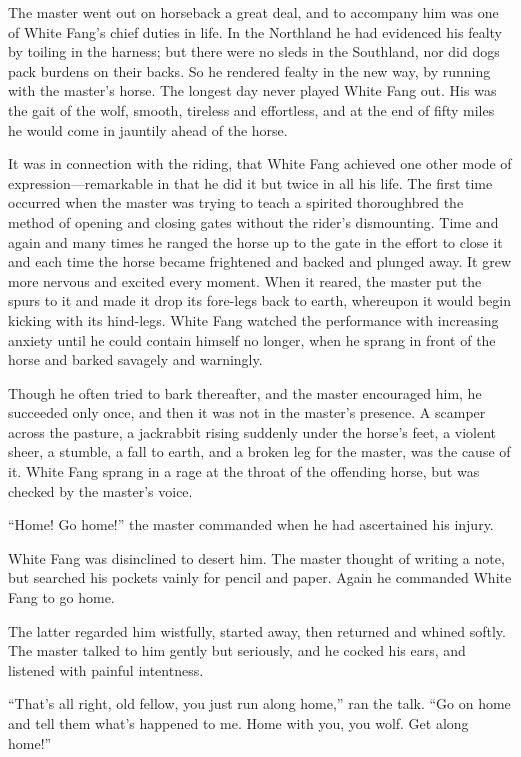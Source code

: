 \documentclass[10pt]{book}
\begin{document}
The master went out on horseback a great deal, and to accompany him was
one of White Fang’s chief duties in life. In the Northland he had
evidenced his fealty by toiling in the harness; but there were no sleds
in the Southland, nor did dogs pack burdens on their backs. So he
rendered fealty in the new way, by running with the master’s horse. The
longest day never played White Fang out. His was the gait of the wolf,
smooth, tireless and effortless, and at the end of fifty miles he would
come in jauntily ahead of the horse.

It was in connection with the riding, that White Fang achieved one
other mode of expression—remarkable in that he did it but twice in all
his life. The first time occurred when the master was trying to teach a
spirited thoroughbred the method of opening and closing gates without
the rider’s dismounting. Time and again and many times he ranged the
horse up to the gate in the effort to close it and each time the horse
became frightened and backed and plunged away. It grew more nervous and
excited every moment. When it reared, the master put the spurs to it
and made it drop its fore-legs back to earth, whereupon it would begin
kicking with its hind-legs. White Fang watched the performance with
increasing anxiety until he could contain himself no longer, when he
sprang in front of the horse and barked savagely and warningly.

Though he often tried to bark thereafter, and the master encouraged
him, he succeeded only once, and then it was not in the master’s
presence. A scamper across the pasture, a jackrabbit rising suddenly
under the horse’s feet, a violent sheer, a stumble, a fall to earth,
and a broken leg for the master, was the cause of it. White Fang sprang
in a rage at the throat of the offending horse, but was checked by the
master’s voice.

“Home! Go home!” the master commanded when he had ascertained his
injury.

White Fang was disinclined to desert him. The master thought of writing
a note, but searched his pockets vainly for pencil and paper. Again he
commanded White Fang to go home.

The latter regarded him wistfully, started away, then returned and
whined softly. The master talked to him gently but seriously, and he
cocked his ears, and listened with painful intentness.

“That’s all right, old fellow, you just run along home,” ran the talk.
“Go on home and tell them what’s happened to me. Home with you, you
wolf. Get along home!”
\end{document}
